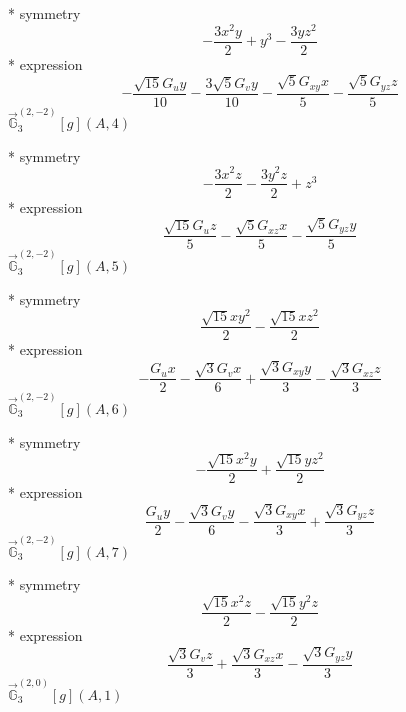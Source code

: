 \documentclass[fleqn,8pt]{jsarticle}
\begin{document}
\noindent\quad ** symmetry
\begin{dmath*}
- \frac{3 x^{2} y}{2} + y^{3} - \frac{3 y z^{2}}{2}
\end{dmath*}
\noindent\quad ** expression
\begin{dmath*}
- \frac{\sqrt{15} G_{u} y}{10} - \frac{3 \sqrt{5} G_{v} y}{10} - \frac{\sqrt{5} G_{xy} x}{5} - \frac{\sqrt{5} G_{yz} z}{5}
\end{dmath*}
\noindent\quad $\vec{\mathbb{G}}_{3}^{(2,-2)}[g](A,4)$

\noindent\quad ** symmetry
\begin{dmath*}
- \frac{3 x^{2} z}{2} - \frac{3 y^{2} z}{2} + z^{3}
\end{dmath*}
\noindent\quad ** expression
\begin{dmath*}
\frac{\sqrt{15} G_{u} z}{5} - \frac{\sqrt{5} G_{xz} x}{5} - \frac{\sqrt{5} G_{yz} y}{5}
\end{dmath*}
\noindent\quad $\vec{\mathbb{G}}_{3}^{(2,-2)}[g](A,5)$

\noindent\quad ** symmetry
\begin{dmath*}
\frac{\sqrt{15} x y^{2}}{2} - \frac{\sqrt{15} x z^{2}}{2}
\end{dmath*}
\noindent\quad ** expression
\begin{dmath*}
- \frac{G_{u} x}{2} - \frac{\sqrt{3} G_{v} x}{6} + \frac{\sqrt{3} G_{xy} y}{3} - \frac{\sqrt{3} G_{xz} z}{3}
\end{dmath*}
\noindent\quad $\vec{\mathbb{G}}_{3}^{(2,-2)}[g](A,6)$

\noindent\quad ** symmetry
\begin{dmath*}
- \frac{\sqrt{15} x^{2} y}{2} + \frac{\sqrt{15} y z^{2}}{2}
\end{dmath*}
\noindent\quad ** expression
\begin{dmath*}
\frac{G_{u} y}{2} - \frac{\sqrt{3} G_{v} y}{6} - \frac{\sqrt{3} G_{xy} x}{3} + \frac{\sqrt{3} G_{yz} z}{3}
\end{dmath*}
\noindent\quad $\vec{\mathbb{G}}_{3}^{(2,-2)}[g](A,7)$

\noindent\quad ** symmetry
\begin{dmath*}
\frac{\sqrt{15} x^{2} z}{2} - \frac{\sqrt{15} y^{2} z}{2}
\end{dmath*}
\noindent\quad ** expression
\begin{dmath*}
\frac{\sqrt{3} G_{v} z}{3} + \frac{\sqrt{3} G_{xz} x}{3} - \frac{\sqrt{3} G_{yz} y}{3}
\end{dmath*}
\noindent\quad $\vec{\mathbb{G}}_{3}^{(2,0)}[g](A,1)$
\end{document}
